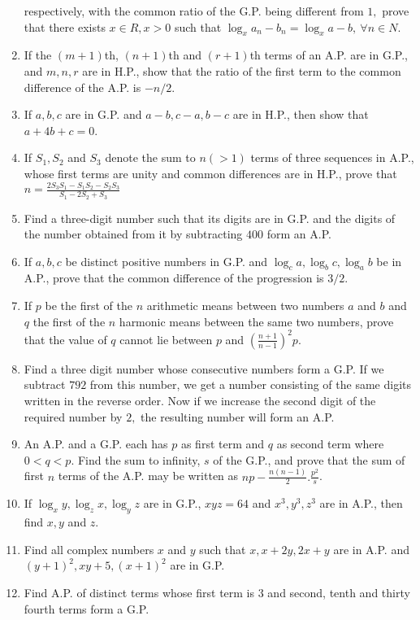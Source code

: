 \begin{enumerate}
  respectively, with the common ratio of the G.P. being different from $1,$ prove that there exists $x\in R, x > 0$ such that
  $\log_x a_n - b_n = \log_x a - b,~\forall n\in N$.
\item If the $(m + 1)$th, $(n + 1)$th and $(r + 1)$th terms of an A.P. are in G.P., and $m, n, r$ are in H.P., show that
  the ratio of the first term to the common difference of the A.P. is $-n/2$.
\item If $a, b, c$ are in G.P. and $a - b, c - a, b - c$ are in H.P., then show that $a + 4b + c = 0$.
\item If $S_1, S_2$ and $S_3$ denote the sum to $n(> 1)$ terms of three sequences in A.P., whose first terms are unity
  and common differences are in H.P., prove that $n = \frac{2S_3S_1 - S_1S_2 - S_2S_3}{S_1 - 2S_2 + S_3}$
\item Find a three-digit number such that its digits are in G.P. and the digits of the number obtained from it by
  subtracting $400$ form an A.P.
\item If $a, b, c$ be distinct positive numbers in G.P. and $\log_c a, \log_b c, \log_a b$ be in A.P., prove that the
  common difference of the progression is $3/2$.
\item If $p$ be the first of the $n$ arithmetic means between two numbers $a$ and $b$ and $q$ the first of the $n$
  harmonic means between the same two numbers, prove that the value of $q$ cannot lie between $p$ and $\left(\frac{n + 1}{n -
    1}\right)^2p$.
\item Find a three digit number whose consecutive numbers form a G.P. If we subtract $792$ from this number, we get a
  number consisting of the same digits written in the reverse order. Now if we increase the second digit of the required number by
  $2,$ the resulting number will form an A.P.
\item An A.P. and a G.P. each has $p$ as first term and $q$ as second term where $0 < q < p.$ Find the sum to infinity,
  $s$ of the G.P., and prove that the sum of first $n$ terms of the A.P. may be written as $np - \frac{n(n - 1)}{2}.\frac{p^2}{s}$.
\item If $\log_xy, \log_zx, \log_yz$ are in G.P., $xyz = 64$ and $x^3, y^3, z^3$ are in A.P., then find $x, y$ and $z.$
\item Find all complex numbers $x$ and $y$ such that $x, x + 2y, 2x + y$ are in A.P. and $(y + 1)^2, xy + 5, (x + 1)^2$
  are in G.P.
\item Find A.P. of distinct terms whose first term is $3$ and second, tenth and thirty fourth terms form a G.P.

\end{enumerate}
